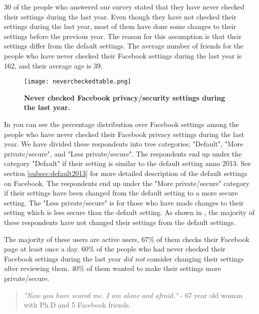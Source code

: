 30 of the people who answered our survey stated that they have never checked their settings during the last year. Even though they have not checked their  settings during the last year, most of them have done some changes to their settings before the previous year. The reason for this assumption is that their settings differ from the default settings.  
The average number of friends for the people who have never checked their Facebook settings during the last year is 162, and their average age is 39. 

\begin{figure}[h!]
\centering
\texttt{[image: nevercheckedtable.png]}
\caption[Never checked Facebook privacy/security settings during the last year]{\textbf{Never checked Facebook privacy/security settings during the last year.}} 
\label{fig:neverchecked}
\end{figure}

In  you can see the percentage distribution over Facebook settings among the people who have never checked their Facebook privacy settings during the last year. We have divided these respondents into tree categories; "Default", "More private/secure", and "Less private/secure". The respondents end up under the category "Default" if their setting is similar to the default setting anno 2013. See section \ref{subsec:default2013} for more detailed description of the default settings on Facebook. The respondents end up under the "More private/secure" category if their settings have been changed from the default setting to a more secure setting. The "Less private/secure" is for those who have made changes to their setting which is less secure than the default setting. As shown in , the majority of these respondents have not changed their settings from the default settings. 

The majority of these users are active users, 67\% of them checks their Facebook page at least once a day. 60\% of the people who had never checked their Facebook settings during the last year \textit{did not} consider changing their settings after reviewing them. 40\% of them wanted to make their settings more private/secure. 

\begin{quote}
\textit{"Now you have scared me. I am alone and afraid."} - 67 year old woman with Ph.D and 5 Facebook friends. 
\end{quote}

